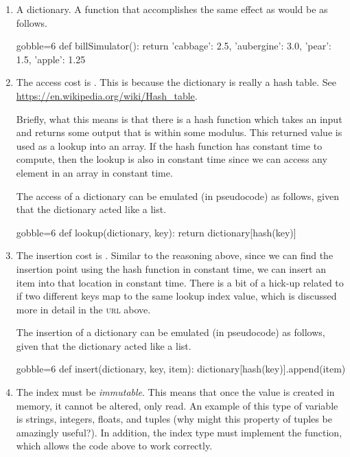 \documentclass[10pt, letterpaper, acro-macros]{python-problem}
\begin{document}
\begin{enumerate}
  \item A dictionary. A function that accomplishes the same effect as
     would be as follows.

    \begin{pycode*}{gobble=6}
      def billSimulator():
          return {'cabbage': 2.5, 'aubergine': 3.0,
                  'pear': 1.5, 'apple': 1.25}
    \end{pycode*}


  \item The access cost is . This is because the dictionary is really
    a hash table. See \url{https://en.wikipedia.org/wiki/Hash_table}.

    Briefly, what this means is that there is a hash function which takes an
    input and returns some output that is within some modulus. This returned
    value is used as a lookup into an array. If the hash function has
    constant time to compute, then the lookup is also in constant time since
    we can access any element in an array in constant time.

    The access of a dictionary can be emulated (in pseudocode) as follows,
    given that the dictionary acted like a list.

    \begin{pycode*}{gobble=6}
      def lookup(dictionary, key):
          return dictionary[hash(key)]
    \end{pycode*}


  \item The insertion cost is . Similar to the reasoning above,
    since we can find the insertion point using the hash function in
    constant time, we can insert an item into that location in constant
    time. There is a bit of a hick-up related to if two different keys map
    to the same lookup index value, which is discussed more in detail in the
    \textsc{url} above.

    The insertion of a dictionary can be emulated (in pseudocode) as follows,
    given that the dictionary acted like a list.

    \begin{pycode*}{gobble=6}
      def insert(dictionary, key, item):
          dictionary[hash(key)].append(item)
    \end{pycode*}


  \item The index must be \emph{immutable}. This means that once the value is
    created in memory, it cannot be altered, only read. An example of this
    type of variable is strings, integers, floats, and tuples (why might
    this property of tuples be amazingly useful?). In addition, the index
    type must implement the  function, which allows the code
    above to work correctly.



\end{enumerate}
\end{document}
